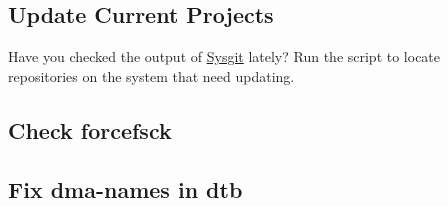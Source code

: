 \documentclass{designdoc}
\begin{document}
\subsection*{Update Current Projects}
Have you checked the output of
\href{https://github.com/AmateurECE/Sysgit}{Sysgit} lately? Run the script to
locate repositories on the system that need updating.

\subsection*{Check forcefsck}

\subsection*{Fix dma-names in dtb}

\end{document}
